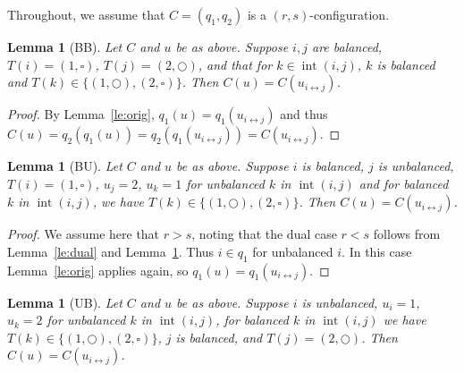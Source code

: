 \documentclass[reqno]{amsart}
\newcommand{\0}{\phantom{c}}
\DeclareMathOperator{\inter}{int} %
\theoremstyle{plain}
\newtheorem{lemma}[thm]{Lemma}
\theoremstyle{definition}
\numberwithin{equation}{section}
\begin{document}
 Throughout, we assume that $C = (q_1, q_2)$ is a $(r,s)$-configuration.

\begin{lemma}[BB]
\label{le:BB}
  Let $C$ and $u$ be as above. Suppose $i,j$ are balanced, $T(i) = (1,\square)$, $T(j) = (2,\bigcirc)$, and that for $k\in\inter(i,j)$, $k$ is balanced and $T(k) \in \{(1,\bigcirc),(2,\square)\}$. Then $C(u) = C(u_{i \leftrightarrow j})$.
\end{lemma}

\begin{proof}
  By Lemma~\ref{le:orig}, $q_1(u) = q_1(u_{i\leftrightarrow j})$ and thus $C(u) = q_2(q_1(u)) = q_2(q_1(u_{i\leftrightarrow j})) = C(u_{i\leftrightarrow j})$.
\end{proof}

\begin{lemma}[BU]
\label{le:BU}
  Let $C$ and $u$ be as above. Suppose $i$ is balanced, $j$ is unbalanced, $T(i) = (1,\square)$, $u_j = 2$, $u_k = 1$ for unbalanced $k$ in $\inter (i,j)$ and for balanced $k$ in $\inter(i,j)$, we have $T(k) \in \{(1,\bigcirc),(2,\square)\}$. Then $C(u) = C(u_{i \leftrightarrow j})$.
 \end{lemma} 
 
\begin{proof}
  We assume here that $r > s$, noting that the dual case $r < s$ follows from Lemma~\ref{le:dual} and Lemma~\ref{le:UB}. Thus $i \in q_1$ for unbalanced $i$. In this case Lemma~\ref{le:orig} applies again, so $q_1(u) = q_1(u_{i\leftrightarrow j})$.
\end{proof}

\begin{lemma}[UB]
\label{le:UB}
  Let $C$ and $u$ be as above. Suppose $i$ is unbalanced, $u_i = 1$, $u_k = 2$ for unbalanced $k$ in $\inter(i,j)$, for balanced $k$ in $\inter(i,j)$ we have $T(k) \in \{(1,\bigcirc),(2,\square)\}$, $j$ is balanced, and $T(j) = (2,\bigcirc)$. Then $C(u) = C(u_{i \leftrightarrow j})$.
\end{lemma}
\end{document}
